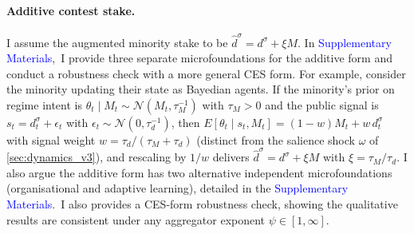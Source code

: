 \documentclass[11pt,twoside]{extarticle}
\newcommand{\suppmat}{\textcolor{blue}{Supplementary Materials}}
\begin{document}

\paragraph{Additive contest stake.} 
I assume the augmented minority stake to be $\hat d^\sigma=d^\sigma+\xi M$. 
In \suppmat,~I provide three separate microfoundations for the additive form and conduct a robustness check with a more general CES form. 
For example, consider the minority updating their state as Bayedian agents. If the minority's prior on regime intent is $\theta_t\mid M_t\sim\mathcal{N}(M_t,\tau_M^{-1})$ with $\tau_M>0$ and the public signal is $s_t=d_t^\sigma+\epsilon_t$ with $\epsilon_t\sim\mathcal{N}(0,\tau_d^{-1})$, then $E[\theta_t\mid s_t,M_t]=(1-w)M_t+w\,d_t^\sigma$ with signal weight $w=\tau_d/(\tau_M+\tau_d)$ (distinct from the salience shock $\omega$ of \autoref{sec:dynamics_v3}), and rescaling by $1/w$ delivers $\hat d^\sigma=d^\sigma+\xi M$ with $\xi=\tau_M/\tau_d$.
I also argue the additive form has two alternative independent microfoundations (organisational and adaptive learning), detailed in the \suppmat.~I also provides a CES-form robustness check, showing the qualitative results are consistent under any aggregator exponent $\psi\in[1,\infty]$. 
\end{document}
